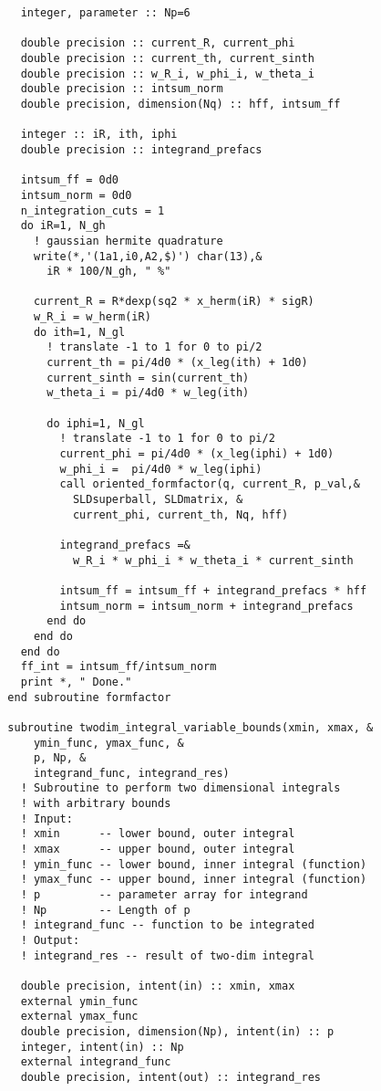 \documentclass[\main/dresen_thesis.tex]{subfiles}
\begin{document}
\begin{lstlisting}
    integer, parameter :: Np=6

    double precision :: current_R, current_phi
    double precision :: current_th, current_sinth
    double precision :: w_R_i, w_phi_i, w_theta_i
    double precision :: intsum_norm
    double precision, dimension(Nq) :: hff, intsum_ff

    integer :: iR, ith, iphi
    double precision :: integrand_prefacs

    intsum_ff = 0d0
    intsum_norm = 0d0
    n_integration_cuts = 1
    do iR=1, N_gh
      ! gaussian hermite quadrature
      write(*,'(1a1,i0,A2,$)') char(13),&
        iR * 100/N_gh, " %"

      current_R = R*dexp(sq2 * x_herm(iR) * sigR)
      w_R_i = w_herm(iR)
      do ith=1, N_gl
        ! translate -1 to 1 for 0 to pi/2
        current_th = pi/4d0 * (x_leg(ith) + 1d0)
        current_sinth = sin(current_th)
        w_theta_i = pi/4d0 * w_leg(ith)

        do iphi=1, N_gl
          ! translate -1 to 1 for 0 to pi/2
          current_phi = pi/4d0 * (x_leg(iphi) + 1d0)
          w_phi_i =  pi/4d0 * w_leg(iphi)
          call oriented_formfactor(q, current_R, p_val,&
            SLDsuperball, SLDmatrix, &
            current_phi, current_th, Nq, hff)

          integrand_prefacs =& 
            w_R_i * w_phi_i * w_theta_i * current_sinth

          intsum_ff = intsum_ff + integrand_prefacs * hff
          intsum_norm = intsum_norm + integrand_prefacs
        end do
      end do
    end do
    ff_int = intsum_ff/intsum_norm
    print *, " Done."
  end subroutine formfactor

  subroutine twodim_integral_variable_bounds(xmin, xmax, &
      ymin_func, ymax_func, &
      p, Np, &
      integrand_func, integrand_res)
    ! Subroutine to perform two dimensional integrals
    ! with arbitrary bounds
    ! Input:
    ! xmin      -- lower bound, outer integral
    ! xmax      -- upper bound, outer integral
    ! ymin_func -- lower bound, inner integral (function)
    ! ymax_func -- upper bound, inner integral (function)
    ! p         -- parameter array for integrand
    ! Np        -- Length of p
    ! integrand_func -- function to be integrated
    ! Output:
    ! integrand_res -- result of two-dim integral

    double precision, intent(in) :: xmin, xmax
    external ymin_func
    external ymax_func
    double precision, dimension(Np), intent(in) :: p
    integer, intent(in) :: Np
    external integrand_func
    double precision, intent(out) :: integrand_res


\end{lstlisting}
\end{document}
